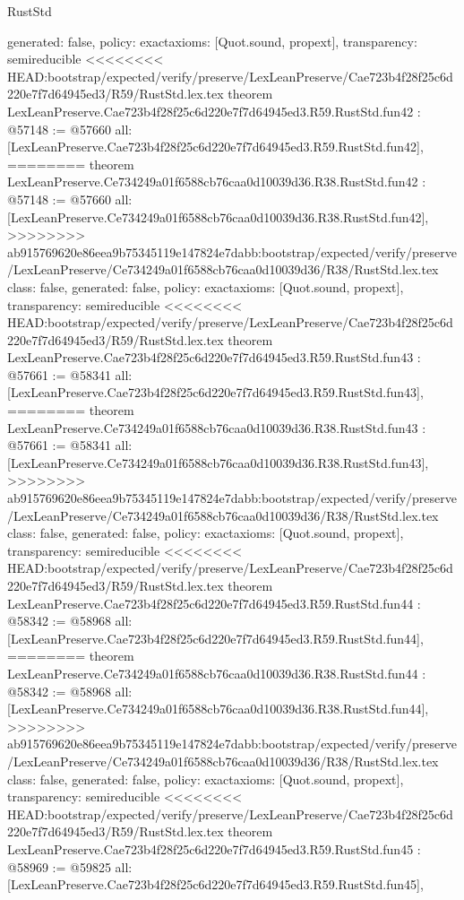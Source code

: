 \begin{lexlean}{RustStd}
\begin{coremodule}
{\begin{coremodule}
{{{{{{{{{{{{{{{{{{{{{{{{{{{{{{{{{{{{{{{{{{{{{  generated: false,
  policy: exact{axioms: [Quot.sound, propext]},
  transparency: semireducible
}
<<<<<<<< HEAD:bootstrap/expected/verify/preserve/LexLeanPreserve/Cae723b4f28f25c6d220e7f7d64945ed3/R59/RustStd.lex.tex
theorem LexLeanPreserve.Cae723b4f28f25c6d220e7f7d64945ed3.R59.RustStd.fun42 : @57148 := @57660 {
  all: [LexLeanPreserve.Cae723b4f28f25c6d220e7f7d64945ed3.R59.RustStd.fun42],
========
theorem LexLeanPreserve.Ce734249a01f6588cb76caa0d10039d36.R38.RustStd.fun42 : @57148 := @57660 {
  all: [LexLeanPreserve.Ce734249a01f6588cb76caa0d10039d36.R38.RustStd.fun42],
>>>>>>>> ab915769620e86eea9b75345119e147824e7dabb:bootstrap/expected/verify/preserve/LexLeanPreserve/Ce734249a01f6588cb76caa0d10039d36/R38/RustStd.lex.tex
  class: false,
  generated: false,
  policy: exact{axioms: [Quot.sound, propext]},
  transparency: semireducible
}
<<<<<<<< HEAD:bootstrap/expected/verify/preserve/LexLeanPreserve/Cae723b4f28f25c6d220e7f7d64945ed3/R59/RustStd.lex.tex
theorem LexLeanPreserve.Cae723b4f28f25c6d220e7f7d64945ed3.R59.RustStd.fun43 : @57661 := @58341 {
  all: [LexLeanPreserve.Cae723b4f28f25c6d220e7f7d64945ed3.R59.RustStd.fun43],
========
theorem LexLeanPreserve.Ce734249a01f6588cb76caa0d10039d36.R38.RustStd.fun43 : @57661 := @58341 {
  all: [LexLeanPreserve.Ce734249a01f6588cb76caa0d10039d36.R38.RustStd.fun43],
>>>>>>>> ab915769620e86eea9b75345119e147824e7dabb:bootstrap/expected/verify/preserve/LexLeanPreserve/Ce734249a01f6588cb76caa0d10039d36/R38/RustStd.lex.tex
  class: false,
  generated: false,
  policy: exact{axioms: [Quot.sound, propext]},
  transparency: semireducible
}
<<<<<<<< HEAD:bootstrap/expected/verify/preserve/LexLeanPreserve/Cae723b4f28f25c6d220e7f7d64945ed3/R59/RustStd.lex.tex
theorem LexLeanPreserve.Cae723b4f28f25c6d220e7f7d64945ed3.R59.RustStd.fun44 : @58342 := @58968 {
  all: [LexLeanPreserve.Cae723b4f28f25c6d220e7f7d64945ed3.R59.RustStd.fun44],
========
theorem LexLeanPreserve.Ce734249a01f6588cb76caa0d10039d36.R38.RustStd.fun44 : @58342 := @58968 {
  all: [LexLeanPreserve.Ce734249a01f6588cb76caa0d10039d36.R38.RustStd.fun44],
>>>>>>>> ab915769620e86eea9b75345119e147824e7dabb:bootstrap/expected/verify/preserve/LexLeanPreserve/Ce734249a01f6588cb76caa0d10039d36/R38/RustStd.lex.tex
  class: false,
  generated: false,
  policy: exact{axioms: [Quot.sound, propext]},
  transparency: semireducible
}
<<<<<<<< HEAD:bootstrap/expected/verify/preserve/LexLeanPreserve/Cae723b4f28f25c6d220e7f7d64945ed3/R59/RustStd.lex.tex
theorem LexLeanPreserve.Cae723b4f28f25c6d220e7f7d64945ed3.R59.RustStd.fun45 : @58969 := @59825 {
  all: [LexLeanPreserve.Cae723b4f28f25c6d220e7f7d64945ed3.R59.RustStd.fun45],
}}}}}}}}}}}}}}}}}}}}}}}}}}}}}}}}}}}}}}}}}}}}}}}}
\end{coremodule}}
\end{coremodule}
\end{lexlean}
